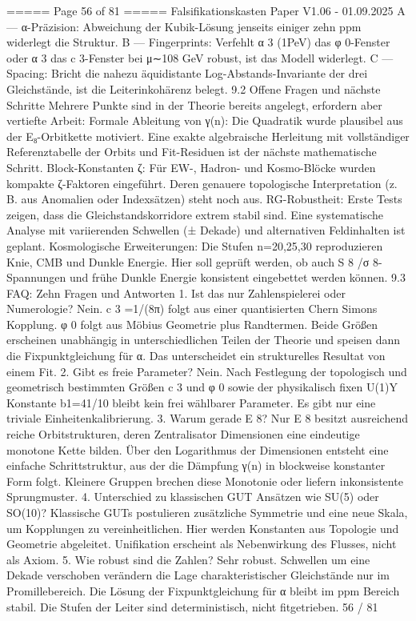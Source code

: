 \begin{MyVerbatim}
{{===== Page 56 of 81 =====
Falsifikationskasten
Paper V1.06 - 01.09.2025
A — α-Präzision: Abweichung der Kubik-Lösung jenseits einiger zehn ppm widerlegt die Struktur.
B — Fingerprints: Verfehlt α 3 (1PeV) das φ 0-Fenster oder α 3 das c 3-Fenster bei μ∼108 GeV robust, ist das Modell
widerlegt.
C — Spacing: Bricht die nahezu äquidistante Log-Abstands-Invariante der drei Gleichstände, ist die Leiterinkohärenz
belegt.
9.2 Offene Fragen und nächste Schritte
Mehrere Punkte sind in der Theorie bereits angelegt, erfordern aber vertiefte Arbeit:
Formale Ableitung von γ(n):
Die Quadratik wurde plausibel aus der E₈-Orbitkette motiviert. Eine exakte algebraische Herleitung mit vollständiger
Referenztabelle der Orbits und Fit-Residuen ist der nächste mathematische Schritt.
Block-Konstanten ζ:
Für EW-, Hadron- und Kosmo-Blöcke wurden kompakte ζ-Faktoren eingeführt. Deren genauere topologische
Interpretation (z. B. aus Anomalien oder Indexsätzen) steht noch aus.
RG-Robustheit:
Erste Tests zeigen, dass die Gleichstandskorridore extrem stabil sind. Eine systematische Analyse mit variierenden
Schwellen (± Dekade) und alternativen Feldinhalten ist geplant.
Kosmologische Erweiterungen:
Die Stufen n=20,25,30 reproduzieren Knie, CMB und Dunkle Energie. Hier soll geprüft werden, ob auch S 8 /σ 8-
Spannungen und frühe Dunkle Energie konsistent eingebettet werden können.
9.3 FAQ: Zehn Fragen und Antworten
1. Ist das nur Zahlenspielerei oder Numerologie?
Nein. c 3 =1/(8π) folgt aus einer quantisierten Chern Simons Kopplung. φ 0 folgt aus Möbius Geometrie plus Randtermen.
Beide Größen erscheinen unabhängig in unterschiedlichen Teilen der Theorie und speisen dann die Fixpunktgleichung
für α. Das unterscheidet ein strukturelles Resultat von einem Fit.
2. Gibt es freie Parameter?
Nein. Nach Festlegung der topologisch und geometrisch bestimmten Größen c 3 und φ 0 sowie der physikalisch fixen
U(1)Y Konstante b1=41/10 bleibt kein frei wählbarer Parameter. Es gibt nur eine triviale Einheitenkalibrierung.
3. Warum gerade E 8?
Nur E 8 besitzt ausreichend reiche Orbitstrukturen, deren Zentralisator Dimensionen eine eindeutige monotone Kette
bilden. Über den Logarithmus der Dimensionen entsteht eine einfache Schrittstruktur, aus der die Dämpfung γ(n) in
blockweise konstanter Form folgt. Kleinere Gruppen brechen diese Monotonie oder liefern inkonsistente Sprungmuster.
4. Unterschied zu klassischen GUT Ansätzen wie SU(5) oder SO(10)?
Klassische GUTs postulieren zusätzliche Symmetrie und eine neue Skala, um Kopplungen zu vereinheitlichen. Hier
werden Konstanten aus Topologie und Geometrie abgeleitet. Unifikation erscheint als Nebenwirkung des Flusses, nicht
als Axiom.
5. Wie robust sind die Zahlen?
Sehr robust. Schwellen um eine Dekade verschoben verändern die Lage charakteristischer Gleichstände nur im
Promillebereich. Die Lösung der Fixpunktgleichung für α bleibt im ppm Bereich stabil. Die Stufen der Leiter sind
deterministisch, nicht fitgetrieben.
56 / 81

}}
\end{MyVerbatim}
